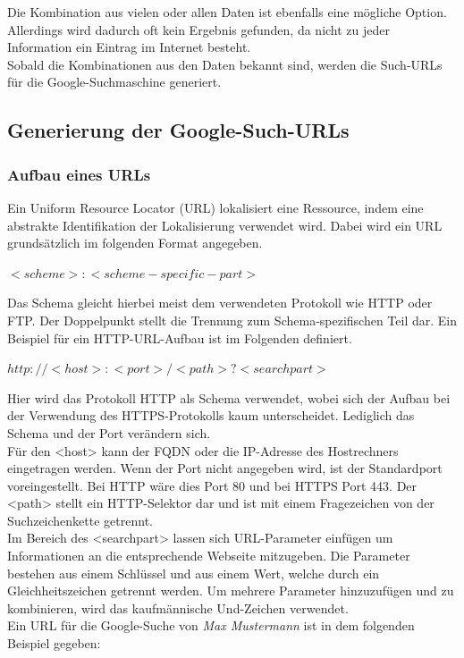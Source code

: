 		
		Die Kombination aus vielen oder allen Daten ist ebenfalls eine mögliche Option. Allerdings wird dadurch oft kein Ergebnis gefunden, da nicht zu jeder Information ein Eintrag im Internet besteht.\\
		Sobald die Kombinationen aus den Daten bekannt sind, werden die Such-URLs für die Google-Suchmaschine generiert.
		\subsection{Generierung der Google-Such-URLs}
			\subsubsection{Aufbau eines URLs}
			\label{subsec:AufbauURL}
			Ein Uniform Resource Locator (URL) lokalisiert eine Ressource, indem eine abstrakte Identifikation der Lokalisierung verwendet wird. Dabei wird ein URL grundsätzlich im folgenden Format angegeben.\cite{RFC1738}
			
			$<scheme>:<scheme-specific-part>$ \cite{RFC1738}
			
			Das Schema gleicht hierbei meist dem verwendeten Protokoll wie HTTP oder FTP. Der Doppelpunkt stellt die Trennung zum Schema-spezifischen Teil dar. Ein Beispiel für ein HTTP-URL-Aufbau ist im Folgenden definiert.\cite{RFC1738}
			
			$http://<host>:<port>/<path>?<searchpart>$\cite{RFC1738}
			
			Hier wird das Protokoll HTTP als Schema verwendet, wobei sich der Aufbau bei der Verwendung des HTTPS-Protokolls kaum unterscheidet. Lediglich das Schema und der Port verändern sich.\\
			Für den <host> kann der FQDN oder die IP-Adresse des Hostrechners eingetragen werden. Wenn der Port nicht angegeben wird, ist der Standardport voreingestellt. Bei HTTP wäre dies Port 80 und bei HTTPS Port 443. Der <path> stellt ein HTTP-Selektor dar und ist mit einem Fragezeichen von der Suchzeichenkette getrennt.\cite{RFC1738}\\ %
			Im Bereich des <searchpart> lassen sich URL-Parameter einfügen um Informationen an die entsprechende Webseite mitzugeben. Die Parameter bestehen aus einem Schlüssel und aus einem Wert, welche durch ein Gleichheitszeichen getrennt werden. Um mehrere Parameter hinzuzufügen und zu kombinieren, wird das kaufmännische Und-Zeichen verwendet.\cite{GoogleURL}\\
			Ein URL für die Google-Suche von \textit{Max Mustermann} ist in dem folgenden Beispiel gegeben:
			
